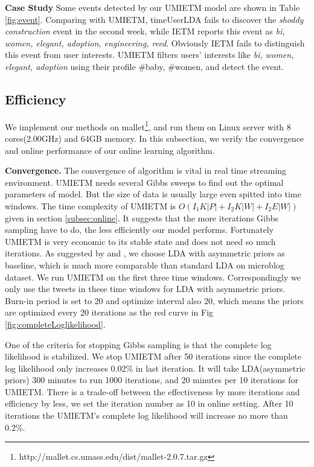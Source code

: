 \documentclass{sig-alternate-05-2015}
\begin{document}
\textbf{Case Study} 
Some events detected by our UMIETM model are shown in Table \ref{fig:event}.
Comparing with UMIETM, timeUserLDA fails to discover the \textit{shoddy construction} event in the second week, while IETM reports this event as \textit{bi, women, elegant, adoption, engineering, reed}. Obviously IETM fails to distinguish this event from user interests.
UMIETM filters users' interests like \textit{bi, women, elegant, adoption} using their profile {\#baby, \#women}, and detect the event.
\subsection{Efficiency}
We implement our methods on mallet\footnote{http://mallet.cs.umass.edu/dist/mallet-2.0.7.tar.gz}, and run them on Linux server with 8 cores(2.00GHz) and 64GB memory.
In this subsection, we verify the convergence and online performance of our online learning algorithm. 

\textbf{Convergence.}
The convergence of algorithm is vital in real time streaming environment. 
UMIETM needs several Gibbs sweeps to find out the optimal parameters of model.
But the size of data is usually large even spitted into time windows.
The time complexity of UMIETM is \(O(I_1K|P|+I_2K|W|+I_2E|W|)\) given in section \ref{subsec:online}.
It suggests that the more iterations Gibbs sampling have to do, the less efficiently our model performs. 
Fortunately UMIETM is very economic to its stable state and does not need so much iterations.
As suggested by \cite{wallach2009rethinking} and \cite{jian2014factorOfTopicModel}, we choose LDA with asymmetric priors as baseline, which is much more comparable than standard LDA on microblog dataset.
We run UMIETM on the first three time windows. 
Correspondingly we only use the tweets in these time windows for LDA with asymmetric priors.
Burn-in period is set to 20 and optimize interval also 20, which means the priors are optimized every 20 iterations as the red curve in Fig \ref{fig:completeLoglikelihood}.

One of the criteria for stopping Gibbs sampling is that the complete log likelihood is stabilized.
We stop UMIETM after 50 iterations since the complete log likelihood only increases 0.02\% in last iteration.
It will take LDA(asymmetric priors) 300 minutes to run 1000 iterations, and 20 minutes per 10 iterations for UMIETM.
There is a trade-off between the effectiveness by more iterations and efficiency by less,  we set the iteration number as 10 in online setting.
After 10 iterations the UMIETM's complete log likelihood will increase no more than 0.2\%.
\end{document}

